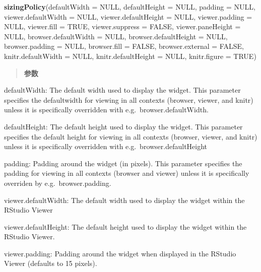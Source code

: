 \documentclass[]{book}
\newenvironment{Shaded}{\begin{snugshade}}{\end{snugshade}}
\newcommand{\KeywordTok}[1]{\textcolor[rgb]{0.13,0.29,0.53}{\textbf{#1}}}
\newcommand{\DataTypeTok}[1]{\textcolor[rgb]{0.13,0.29,0.53}{#1}}
\newcommand{\OtherTok}[1]{\textcolor[rgb]{0.56,0.35,0.01}{#1}}
\newcommand{\NormalTok}[1]{#1}
\theoremstyle{definition}
\theoremstyle{definition}
\theoremstyle{definition}
\theoremstyle{remark}
\begin{document}
\begin{Shaded}
\begin{Highlighting}[]
\KeywordTok{sizingPolicy}\NormalTok{(}\DataTypeTok{defaultWidth =} \OtherTok{NULL}\NormalTok{, }\DataTypeTok{defaultHeight =} \OtherTok{NULL}\NormalTok{, }\DataTypeTok{padding =} \OtherTok{NULL}\NormalTok{,}
  \DataTypeTok{viewer.defaultWidth =} \OtherTok{NULL}\NormalTok{, }\DataTypeTok{viewer.defaultHeight =} \OtherTok{NULL}\NormalTok{,}
  \DataTypeTok{viewer.padding =} \OtherTok{NULL}\NormalTok{, }\DataTypeTok{viewer.fill =} \OtherTok{TRUE}\NormalTok{, }\DataTypeTok{viewer.suppress =} \OtherTok{FALSE}\NormalTok{,}
  \DataTypeTok{viewer.paneHeight =} \OtherTok{NULL}\NormalTok{, }\DataTypeTok{browser.defaultWidth =} \OtherTok{NULL}\NormalTok{,}
  \DataTypeTok{browser.defaultHeight =} \OtherTok{NULL}\NormalTok{, }\DataTypeTok{browser.padding =} \OtherTok{NULL}\NormalTok{,}
  \DataTypeTok{browser.fill =} \OtherTok{FALSE}\NormalTok{, }\DataTypeTok{browser.external =} \OtherTok{FALSE}\NormalTok{,}
  \DataTypeTok{knitr.defaultWidth =} \OtherTok{NULL}\NormalTok{, }\DataTypeTok{knitr.defaultHeight =} \OtherTok{NULL}\NormalTok{,}
  \DataTypeTok{knitr.figure =} \OtherTok{TRUE}\NormalTok{)}
\end{Highlighting}
\end{Shaded}

\begin{quote}
\textbf{参数}
\end{quote}

defaultWidth: The default width used to display the widget. This
parameter specifies the defaultwidth for viewing in all contexts
(browser, viewer, and knitr) unless it is specifically overridden with
e.g.~browser.defaultWidth.

defaultHeight: The default height used to display the widget. This
parameter specifies the default height for viewing in all contexts
(browser, viewer, and knitr) unless it is specifically overridden with
e.g.~browser.defaultHeight

padding: Padding around the widget (in pixels). This parameter specifies
the padding for viewing in all contexts (browser and viewer) unless it
is specifically overriden by e.g.~browser.padding.

viewer.defaultWidth: The default width used to display the widget within
the RStudio Viewer

viewer.defaultHeight: The default height used to display the widget
within the RStudio Viewer.

viewer.padding: Padding around the widget when displayed in the RStudio
Viewer (defaults to 15 pixels).
\end{document}
